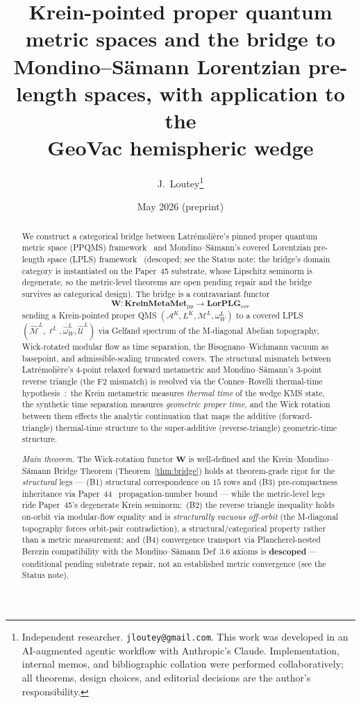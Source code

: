 \documentclass[11pt,a4paper]{article}
\title{Krein-pointed proper quantum metric spaces and the bridge to\\
Mondino--S\"amann Lorentzian pre-length spaces, with application to the\\
GeoVac hemispheric wedge}
\author{J.~Loutey\thanks{Independent researcher. \texttt{jloutey@gmail.com}.
This work was developed in an AI-augmented agentic workflow with
Anthropic's Claude. Implementation, internal memos, and bibliographic
collation were performed collaboratively; all theorems, design choices,
and editorial decisions are the author's responsibility.}}
\date{May 2026 (preprint)}
\theoremstyle{plain}
\theoremstyle{definition}
\newcommand{\Acal}{\mathcal{A}}
\newcommand{\Mcal}{\mathcal{M}}
\newcommand{\Ucal}{\mathcal{U}}
\newcommand{\Wfun}{\mathbf{W}}
\newcommand{\KreinMM}{\mathbf{KreinMetaMet}_{\mathrm{pp}}}
\newcommand{\LorPLG}{\mathbf{LorPLG}_{\mathrm{cov}}}
\newcommand{\BWvac}{\omega_{W}^{L}}
\begin{document}
\maketitle

\begin{abstract}
We construct a categorical bridge between Latr\'emoli\`ere's pinned
proper quantum metric space (PPQMS) framework~\cite{latremoliere2025_hypertopology}
and Mondino--S\"amann's covered Lorentzian pre-length space (LPLS)
framework~\cite{mondino_samann2025_pointed} (descoped; see the Status note: the bridge's domain category is
instantiated on the Paper~45 substrate, whose Lipschitz seminorm is
degenerate, so the metric-level theorems are open pending repair
and the bridge survives as categorical design). The bridge is a contravariant
functor
\[
\Wfun: \KreinMM \longrightarrow \LorPLG
\]
sending a Krein-pointed proper QMS $(\Acal^{K}, L^{K}, \Mcal^{L}, \BWvac)$
to a covered LPLS $(\hat{\Mcal}^{L}, \ell^{L}, \hat{\omega}_{W}^{L},
\hat{\Ucal}^{L})$ via Gelfand spectrum of the M-diagonal Abelian
topography, Wick-rotated modular flow as time separation, the
Bisognano--Wichmann vacuum as basepoint, and admissible-scaling
truncated covers. The structural mismatch between Latr\'emoli\`ere's
4-point relaxed forward metametric and Mondino--S\"amann's 3-point
reverse triangle (the F2 mismatch) is resolved via the Connes--Rovelli
thermal-time hypothesis~\cite{connes_rovelli1994}:\ the Krein
metametric measures \emph{thermal time} of the wedge KMS state, the
synthetic time separation measures \emph{geometric proper time}, and
the Wick rotation between them effects the analytic continuation that
maps the additive (forward-triangle) thermal-time structure to the
super-additive (reverse-triangle) geometric-time structure.

\medskip

\noindent\emph{Main theorem.} The Wick-rotation functor $\Wfun$ is
well-defined and the Krein--Mondino--S\"amann Bridge Theorem
(Theorem~\ref{thm:bridge}) holds at theorem-grade rigor for the
\emph{structural} legs --- (B1) structural correspondence on $15$ rows
and (B3) pre-compactness inheritance via Paper~44~\cite{paper44}
propagation-number bound --- while the metric-level legs ride Paper~45's
degenerate Krein seminorm:\ (B2) the reverse triangle inequality holds
on-orbit via modular-flow equality and is \emph{structurally vacuous
off-orbit} (the M-diagonal topography forces orbit-pair contradiction),
a structural/categorical property rather than a metric measurement; and
(B4) convergence transport via Plancherel-nested Berezin compatibility
with the Mondino--S\"amann Def~3.6 axioms is \textbf{descoped} ---
conditional pending substrate repair, not an established metric
convergence (see the Status note).


\end{abstract}
\end{document}
